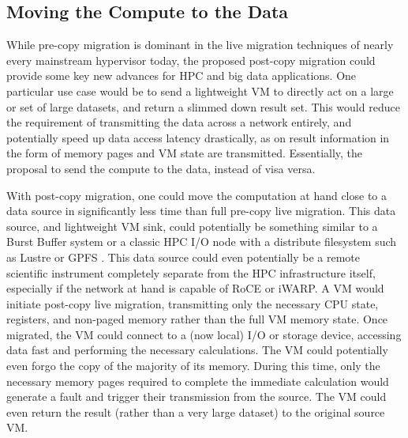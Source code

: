 %
%







\subsection{Moving the Compute to the Data}


While pre-copy migration is dominant in the live migration techniques of nearly every mainstream hypervisor today, the proposed post-copy migration could provide some key new advances for HPC and big data applications. One particular use case would be to send a lightweight VM to directly act on a large or set of large datasets, and return a slimmed down result set. This would reduce the requirement of transmitting the data across a network entirely, and potentially speed up data access latency drastically, as on result information in the form of memory pages and VM state are transmitted. Essentially, the proposal to send the compute to the data, instead of visa versa.  

With post-copy migration, one could move the computation at hand close to a data source in significantly less time than full pre-copy live migration. This data source, and lightweight VM sink, could potentially be something similar to a Burst Buffer system \cite{Lofstead2014,wright2015trinity} or a classic HPC I/O node with a distribute filesystem such as Lustre or GPFS \cite{schmuck2002gpfs}. This data source could even potentially be a remote scientific instrument completely separate from the HPC infrastructure itself, especially if the network at hand is capable of RoCE \cite{beck2011roce} or iWARP\cite{rashti200710}.  A VM would initiate post-copy live migration, transmitting  only the necessary CPU state, registers, and non-paged memory rather than the full VM memory state. Once migrated, the VM could connect to a (now local) I/O or storage device, accessing data fast and performing the necessary calculations. The VM could potentially even forgo the copy of the majority of its memory. During this time, only the necessary memory pages required to complete the immediate calculation would generate a fault and trigger their transmission from the source.  The VM could even return the result (rather than a very large dataset) to the original source VM. 

